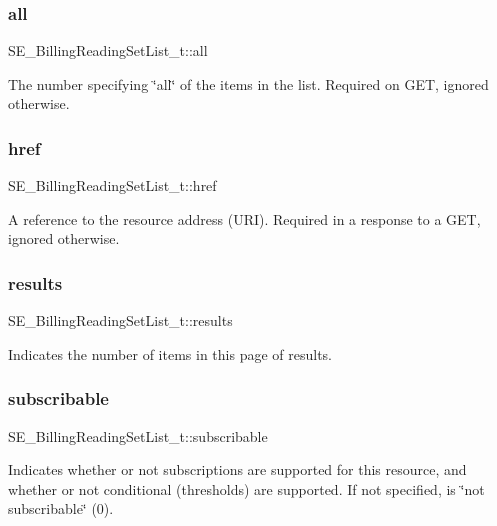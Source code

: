 \subsubsection{\texorpdfstring{all}{all}}
{\footnotesize\ttfamily S\+E\+\_\+\+Billing\+Reading\+Set\+List\+\_\+t\+::all}

The number specifying \char`\"{}all\char`\"{} of the items in the list. Required on G\+ET, ignored otherwise. \mbox{\label{group__BillingReadingSetList_ga517a08d060d1767f0171f645def9e00d}} 
\subsubsection{\texorpdfstring{href}{href}}
{\footnotesize\ttfamily S\+E\+\_\+\+Billing\+Reading\+Set\+List\+\_\+t\+::href}

A reference to the resource address (U\+RI). Required in a response to a G\+ET, ignored otherwise. \mbox{\label{group__BillingReadingSetList_ga9e175aeff78de11da028b57ed27c610b}} 
\subsubsection{\texorpdfstring{results}{results}}
{\footnotesize\ttfamily S\+E\+\_\+\+Billing\+Reading\+Set\+List\+\_\+t\+::results}

Indicates the number of items in this page of results. \mbox{\label{group__BillingReadingSetList_gaf43e69532d7afb41951cec8451b82e46}} 
\subsubsection{\texorpdfstring{subscribable}{subscribable}}
{\footnotesize\ttfamily S\+E\+\_\+\+Billing\+Reading\+Set\+List\+\_\+t\+::subscribable}

Indicates whether or not subscriptions are supported for this resource, and whether or not conditional (thresholds) are supported. If not specified, is \char`\"{}not subscribable\char`\"{} (0). 